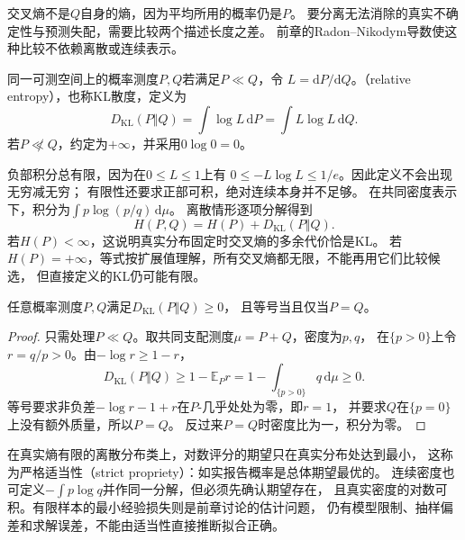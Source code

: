 交叉熵不是\(Q\)自身的熵，因为平均所用的概率仍是\(P\)。
要分离无法消除的真实不确定性与预测失配，需要比较两个描述长度之差。
前章的Radon--Nikodym导数使这种比较不依赖离散或连续表示。

\begin{definition}[相对熵]
\label{def:information-kl-divergence}
同一可测空间上的概率测度\(P,Q\)若满足\(P\ll Q\)，令
\(L=\mathrm dP/\mathrm dQ\)。（relative entropy），也称KL散度，定义为
\begin{equation}
  D_{\mathrm{KL}}(P\Vert Q)
  =\int\log L\,\mathrm dP=\int L\log L\,\mathrm dQ.
  \label{eq:information-kl-divergence}
\end{equation}
若\(P\not\ll Q\)，约定为\(+\infty\)，并采用\(0\log0=0\)。
\end{definition}

负部积分总有限，因为在\(0\leq L\leq1\)上有
\(0\leq-L\log L\leq1/e\)。因此定义不会出现无穷减无穷；
有限性还要求正部可积，绝对连续本身并不足够。
在共同密度表示下，积分为\(\int p\log(p/q)\,\mathrm d\mu\)。
离散情形逐项分解得到
\begin{equation}
  H(P,Q)=H(P)+D_{\mathrm{KL}}(P\Vert Q).
  \label{eq:information-cross-entropy-decomposition}
\end{equation}
若\(H(P)<\infty\)，这说明真实分布固定时交叉熵的多余代价恰是KL。
若\(H(P)=+\infty\)，等式按扩展值理解，所有交叉熵都无限，不能再用它们比较候选，
但直接定义的KL仍可能有限。

\begin{theorem}[Gibbs不等式]
\label{thm:information-gibbs-inequality}
任意概率测度\(P,Q\)满足\(D_{\mathrm{KL}}(P\Vert Q)\geq0\)，
且等号当且仅当\(P=Q\)。
\end{theorem}
\begin{proof}
只需处理\(P\ll Q\)。取共同支配测度\(\mu=P+Q\)，密度为\(p,q\)，
在\(\{p>0\}\)上令\(r=q/p>0\)。由\(-\log r\geq1-r\)，
\[
  D_{\mathrm{KL}}(P\Vert Q)
  \geq1-\mathbb E_Pr
  =1-\int_{\{p>0\}}q\,\mathrm d\mu\geq0.
\]
等号要求非负差\(-\log r-1+r\)在\(P\)-几乎处处为零，即\(r=1\)，
并要求\(Q\)在\(\{p=0\}\)上没有额外质量，所以\(P=Q\)。
反过来\(P=Q\)时密度比为一，积分为零。
\end{proof}

在真实熵有限的离散分布类上，对数评分的期望只在真实分布处达到最小，
这称为严格适当性（strict propriety）：如实报告概率是总体期望最优的。
连续密度也可定义\(-\int p\log q\)并作同一分解，但必须先确认期望存在，
且真实密度的对数可积。有限样本的最小经验损失则是前章讨论的估计问题，
仍有模型限制、抽样偏差和求解误差，不能由适当性直接推断拟合正确。

